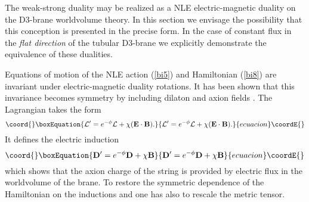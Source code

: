 \documentclass[a4paper,12pt]{article}
\begin{document}
\noindent

The weak-strong duality may be realized as a NLE electric-magnetic duality 
on the D3-brane worldvolume theory. In this section we envisage the 
possibility that this conception is presented in the precise form. In the 
case of constant flux in the {\it flat direction} of the tubular D3-brane 
we explicitly demonstrate the equivalence of these dualities.

\noindent

Equations of motion of the NLE action (\ref{bi5}) and Hamiltonian (\ref{bi8}) 
are invariant under \coordHE{} electric-magnetic duality rotations. It has been 
shown that this invariance becomes \coordHE{} symmetry by including 
dilaton and axion fields \cite{2,3,4}. The Lagrangian takes the form 
\cite{3,5,6} 
\begin{equation}\coord{}\boxEquation{
{\cal L}^{\prime}=e^{-\phi}{\cal L}+\chi(\e\cdot\m).
\label{d1}
}{
{\cal L}^{\prime}=e^{-\phi}{\cal L}+\chi(\e\cdot\m).
}{ecuacion}\coordE{}\end{equation}
It defines the electric induction \myHighlight{${\d}^{\prime}$}\coordHE{}
\begin{equation}\coord{}\boxEquation{
{\d}^{\prime}=e^{-\phi}\d+\chi\m
\label{d2}
}{
{\d}^{\prime}=e^{-\phi}\d+\chi\m
}{ecuacion}\coordE{}\end{equation}
which shows that the axion charge of the string is provided by electric flux
in the worldvolume of the brane. To restore the symmetric dependence of the 
Hamiltonian on the inductions \myHighlight{${\d}^{\prime}$}\coordHE{} and \myHighlight{$\h$}\coordHE{} one has also to 
rescale the metric tensor.

\noindent
\end{document}
